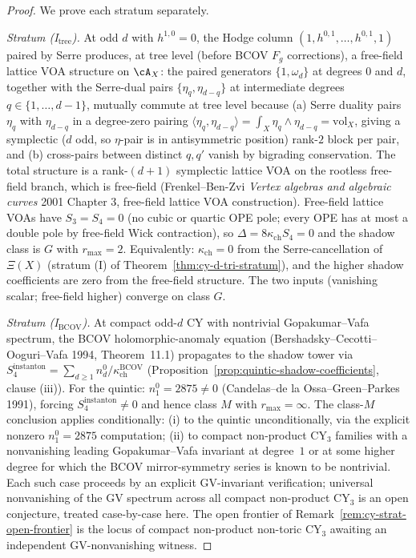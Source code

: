 \begin{proof}
We prove each stratum separately.

\emph{Stratum (I$_{\mathrm{tree}}$).} At odd $d$ with $h^{1, 0} = 0$,
the Hodge column $(1, h^{0, 1}, \ldots, h^{0, 1}, 1)$ paired by
Serre produces, at tree level (before BCOV $F_g$ corrections), a
free-field lattice VOA structure on $\cA_X$: the paired generators
$\{1, \omega_{d}\}$ at degrees $0$ and $d$, together with the Serre-dual
pairs $\{\eta_q, \eta_{d - q}\}$ at intermediate degrees
$q \in \{1, \ldots, d - 1\}$, mutually commute at tree level because
\textup{(a)} Serre duality pairs $\eta_q$ with $\eta_{d - q}$ in a
degree-zero pairing $\langle \eta_q, \eta_{d - q}\rangle = \int_X
\eta_q \wedge \eta_{d - q} = \mathrm{vol}_X$, giving a symplectic
($d$ odd, so $\eta$-pair is in antisymmetric position) rank-$2$
block per pair, and \textup{(b)} cross-pairs between distinct
$q, q'$ vanish by bigrading conservation. The total structure is a
rank-$(d + 1)$ symplectic lattice VOA on the rootless free-field branch,
which is free-field
(Frenkel--Ben-Zvi \emph{Vertex algebras and algebraic curves} 2001
Chapter 3, free-field lattice VOA construction). Free-field
lattice VOAs have $S_3 = S_4 = 0$ (no cubic or quartic OPE pole;
every OPE has at most a double pole by free-field Wick contraction),
so $\Delta = 8 \kappa_{\mathrm{ch}} S_4 = 0$ and the shadow class is
$G$ with $r_{\max} = 2$. Equivalently: $\kappa_{\mathrm{ch}} = 0$
from the Serre-cancellation of $\Xi(X)$ (stratum (I) of
Theorem~\ref{thm:cy-d-tri-stratum}), and the higher shadow
coefficients are zero from the free-field structure. The two inputs
(vanishing scalar; free-field higher) converge on class $G$.

\emph{Stratum (I$_{\mathrm{BCOV}}$).} At compact odd-$d$ CY with
nontrivial Gopakumar--Vafa spectrum, the BCOV holomorphic-anomaly
equation (Bershadsky--Cecotti--Ooguri--Vafa 1994, Theorem~11.1)
propagates to the shadow tower via
$S_4^{\mathrm{instanton}} = \sum_{d \geq 1} n^0_d / \kappa_{\mathrm{ch}}^{\mathrm{BCOV}}$
(Proposition~\ref{prop:quintic-shadow-coefficients}, clause (iii)).
For the quintic: $n^0_1 = 2875 \neq 0$ (Candelas--de la Ossa--Green--Parkes 1991),
forcing $S_4^{\mathrm{instanton}} \neq 0$ and hence class $M$ with
$r_{\max} = \infty$. The class-$M$ conclusion applies conditionally:
\textup{(i)} to the quintic unconditionally, via the explicit nonzero
$n^0_1 = 2875$ computation; \textup{(ii)} to compact non-product
CY$_3$ families with a nonvanishing leading Gopakumar--Vafa invariant
at degree~$1$ or at some higher degree for which the BCOV
mirror-symmetry series is known to be nontrivial. Each such case
proceeds by an explicit GV-invariant verification; universal
nonvanishing of the GV spectrum across all compact non-product CY$_3$
is an open conjecture, treated case-by-case here. The open frontier of
Remark~\ref{rem:cy-strat-open-frontier} is the locus of compact
non-product non-toric CY$_3$ awaiting an independent GV-nonvanishing
witness.


\end{proof}
